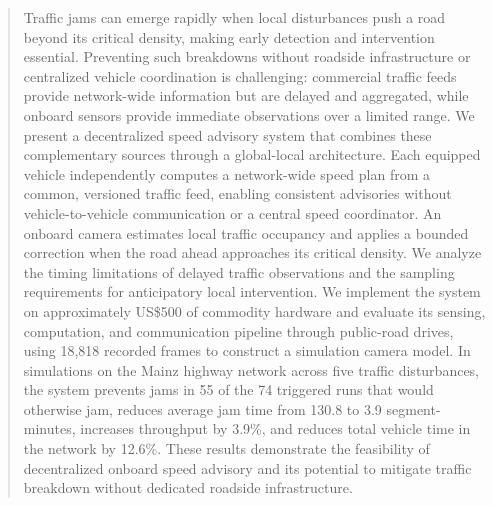 \begin{abstract}
Traffic jams can emerge rapidly when local disturbances push a road beyond its critical density, making early detection and intervention essential. Preventing such breakdowns without roadside infrastructure or centralized vehicle coordination is challenging: commercial traffic feeds provide network-wide information but are delayed and aggregated, while onboard sensors provide immediate observations over a limited range. We present a decentralized speed advisory system that combines these complementary sources through a global-local architecture. Each equipped vehicle independently computes a network-wide speed plan from a common, versioned traffic feed, enabling consistent advisories without vehicle-to-vehicle communication or a central speed coordinator. An onboard camera estimates local traffic occupancy and applies a bounded correction when the road ahead approaches its critical density. We analyze the timing limitations of delayed traffic observations and the sampling requirements for anticipatory local intervention. We implement the system on approximately US\$500 of commodity hardware and evaluate its sensing, computation, and communication pipeline through public-road drives, using 18,818 recorded frames to construct a simulation camera model. In simulations on the Mainz highway network across five traffic disturbances, the system prevents jams in 55 of the 74 triggered runs that would otherwise jam, reduces average jam time from 130.8 to 3.9 segment-minutes, increases throughput by 3.9\%, and reduces total vehicle time in the network by 12.6\%. These results demonstrate the feasibility of decentralized onboard speed advisory and its potential to mitigate traffic breakdown without dedicated roadside infrastructure.
\end{abstract}
